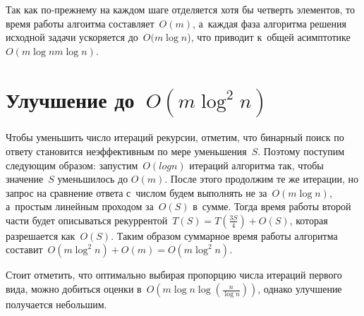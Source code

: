 \documentclass{article}
\begin{document}
Так как по-прежнему на каждом шаге отделяется хотя бы четверть элементов, то
время работы алгоитма составляет~$O(m)$, а~каждая фаза алгоритма решения
исходной задачи ускоряется до~$O(m \log n$), что приводит к~общей
асимптотике~$O(m \log nm \log n)$.

\section{Улучшение до~$O(m \log^2 n)$}

Чтобы уменьшить число итераций рекурсии, отметим, что бинарный поиск по ответу
становится неэффективным по мере уменьшения~$S$. Поэтому поступим следующим
образом: запустим~$O(log n)$ итераций алгоритма так, чтобы значение~$S$
уменьшилось до $O(m)$. После этого продолжим те же итерации, но запрос на
сравнение ответа с~числом будем выполнять не за~$O(m \log n)$, а~простым
линейным проходом за~$O(S)$ в~сумме. Тогда время работы второй части будет
описываться рекуррентой~$T(S) = T(\frac{3S}{4}) + O(S)$, которая разрешается
как~$O(S)$. Таким образом суммарное время работы алгоритма составит~$O(m \log^2
n) + O(m) = O(m \log^2 n)$.

Стоит отметить, что оптимально выбирая пропорцию числа итераций первого вида,
можно добиться оценки в~$O\left(m \log n \log\left(\frac{n}{\log n}\right)
\right)$, однако улучшение получается небольшим.
\end{document}
